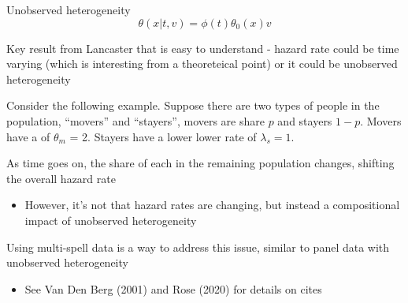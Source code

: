 \documentclass[notes,11pt, aspectratio=169]{beamer}
\newenvironment{wideitemize}{\itemize\addtolength{\itemsep}{10pt}}{\enditemize}
\begin{document}
  \begin{frame}{Unobserved heterogeneity}
      \begin{equation}
        \theta(x|t, v) = \phi(t) \theta_{0}(x) v
      \end{equation}
    
      \begin{wideitemize}
      \item   Key result from Lancaster that is easy to understand - hazard rate could be time varying (which is interesting from a theoreteical point) or it could be unobserved heterogeneity
      \item Consider the following example. Suppose there are two
        types of people in the population, ``movers'' and ``stayers'',
        movers are share $p$ and stayers $1-p$. Movers have a of
        $\theta_{m}$ = 2. Stayers have a lower lower rate of
        $\lambda_{s} = 1$.
      \item As time goes on, the share of each in the remaining
        population changes, shifting the overall hazard rate
        \begin{itemize}
        \item However, it's not that hazard rates are changing, but
          instead a compositional impact of unobserved heterogeneity
        \end{itemize}
      \item Using multi-spell data is a way to address this issue,
        similar to panel data with unobserved heterogeneity
        \begin{itemize}
        \item See Van Den Berg (2001) and Rose (2020) for details on cites
        \end{itemize}
      \end{wideitemize}
\end{frame}
\end{document}
